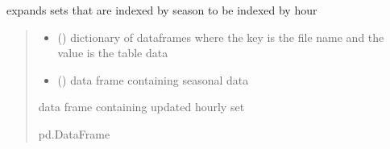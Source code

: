 \documentclass[letterpaper,10pt,english]{sphinxmanual}
\begin{document}
\begin{fulllineitems}
\label{\detokenize{src.models.electricity.scripts.preprocessor:src.models.electricity.scripts.preprocessor.create_hourly_sets}}
\pysigstartsignatures
\pysiglinewithargsret
{}
{\sphinxparamcomma {}}
{}
\pysigstopsignatures
\sphinxAtStartPar
expands sets that are indexed by season to be indexed by hour
\begin{quote}\begin{description}
\begin{itemize}
\item {} 
\sphinxAtStartPar
{} () \textendash{} dictionary of dataframes where the key is the file name and the value is the table data

\item {} 
\sphinxAtStartPar
{} () \textendash{} data frame containing seasonal data

\end{itemize}

\sphinxAtStartPar
data frame containing updated hourly set

\sphinxAtStartPar
pd.DataFrame

\end{description}\end{quote}

\end{fulllineitems}

\end{document}
